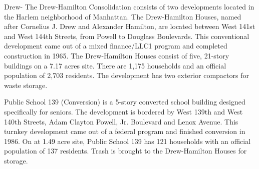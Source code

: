 Drew-
The Drew-Hamilton Consolidation consists of two developments located in the Harlem neighborhood of Manhattan. The Drew-Hamilton Houses, named after Cornelius J. Drew and Alexander Hamilton, are located between West 141st and West 144th Streets, from Powell to Douglass Boulevards. This conventional development came out of a mixed finance/LLC1 program and completed construction in 1965. The Drew-Hamilton Houses consist of five, 21-story buildings on a 7.17 acres site. There are 1,175 households and an official population of 2,703 residents. The development has two exterior compactors for waste storage.

Public School 139 (Conversion) is a 5-story converted school building designed specifically for seniors. The development is bordered by West 139th and West 140th  Streets, Adam Clayton Powell, Jr. Boulevard and Lenox Avenue. This turnkey development came out of a federal program and finished conversion in 1986. On at 1.49 acre site, Public School 139 has 121 households with an official population of 137 residents. Trash is brought to the Drew-Hamilton Houses for storage. 